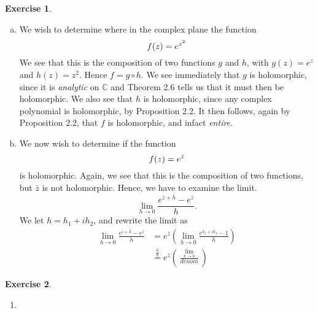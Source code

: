 \documentclass[10pt]{amsart}
\newcommand{\C}{\mathbb{C}}
\theoremstyle{definition}
\newtheorem{exercise}{Exercise}
\newcommand{\limh}{\lim_{h \to 0}}
\begin{document}
\begin{exercise}\hfill
  \begin{enumerate}[a)]
    \item We wish to determine where in the complex plane the function
      \begin{equation}
        \notag
        f(z) = e^{z^2}
      \end{equation}
      We see that this is the composition of two functions $g$ and $h$, with
      $g(z) = e^z$ and $h(z) = z^2$. Hence $f = g \circ h$.  We see immediately
      that $g$ is holomorphic, since it is \emph{analytic} on $\C$ and Theorem
      2.6 tells us that it must then be holomorphic. We also see that $h$ is
      holomorphic, since any complex polynomial is holomorphic, by Proposition
      2.2. It then follows, again by Proposition 2.2, that $f$ is holomorphic, and infact \emph{entire}.
    \item We now wish to determine if the function
      \begin{equation}
        \notag
        f(z) = e^{\bar{z}}
      \end{equation}
      is holomorphic. Again, we see that this is the composition of two functions, but $\bar{z}$ is not holomorphic. Hence, we have to examine the limit.
      \begin{equation}
        \label{eq:lim}
        \lim_{h \to 0} \frac{e^{\bar{z} + \bar{h}} - e^{\bar{z}}}{h}.
      \end{equation}
      We let $h = h_1 + ih_2$, and rewrite the limit as
      \begin{align*}
        \lim_{h \to 0} \frac{e^{\bar{z} + \bar{h}} - e^{\bar{z}}}{h} &= e^{\bar{z}} \left( \limh \frac{e^{h_1+ih_2} - 1}{h} \right) \\
                                                                     &\overset{\frac{0}{0}}{=} e^{\bar{z}} \left( \frac{\limh }{denom} \right)
      \end{align*}
    
  \end{enumerate} 
\end{exercise}

\begin{exercise}\hfill
  \begin{enumerate}
    \item 
  \end{enumerate} 
\end{exercise}
\end{document}
